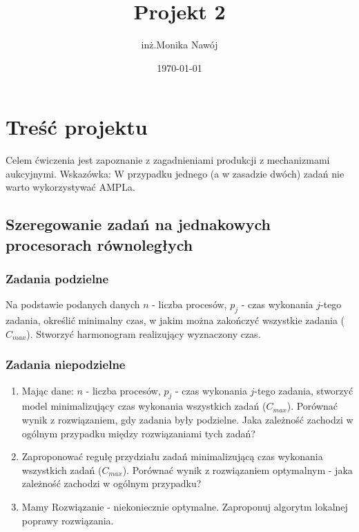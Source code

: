 \documentclass[
    12pt, %
]{../fphw}
\title{Projekt 2} %
\author{inż.Monika Nawój} %
\date{\today} %
\institute{Politechnika Warszawska \\ Wydział Elektroniki i Technik Informacyjnych} %
\begin{document}
\maketitle %


\section{Treść projektu}
Celem ćwiczenia jest zapoznanie z zagadnieniami produkcji
z mechanizmami aukcyjnymi.
Wskazówka: W przypadku jednego (a w zasadzie dwóch) zadań nie warto
wykorzystywać AMPLa.
\subsection {Szeregowanie zadań na jednakowych procesorach równoległych}
\subsubsection{Zadania podzielne}
Na podstawie podanych danych \(n\) - liczba procesów,
\(p_j\) - czas wykonania \(j\)-tego zadania, określić minimalny czas,
w jakim można zakończyć wszystkie zadania (\(C_{max}\)).
Stworzyć harmonogram realizujący wyznaczony czas.

\subsubsection{Zadania niepodzielne}
\begin{enumerate}[label=(\alph*)]
    \item \label{12a} Mając dane: \(n\) - liczba procesów, \(p_j\) - czas wykonania
          \(j\)-tego zadania, stworzyć model minimalizujący czas wykonania
          wszystkich zadań (\(C_{max}\)). Porównać wynik z rozwiązaniem,
          gdy zadania były podzielne.
          Jaka zależność zachodzi w ogólnym przypadku między rozwiązaniami tych zadań?
    \item \label{12b} Zaproponować regułę przydziału zadań minimalizującą czas
          wykonania wszystkich zadań (\(C_{max}\)).
          Porównać wynik z rozwiązaniem optymalnym - jaka zależność zachodzi w ogólnym przypadku?
    \item \label{12c} Mamy Rozwiązanie - niekoniecznie optymalne. Zaproponuj algorytm lokalnej poprawy rozwiązania.
\end{enumerate}
\end{document}
